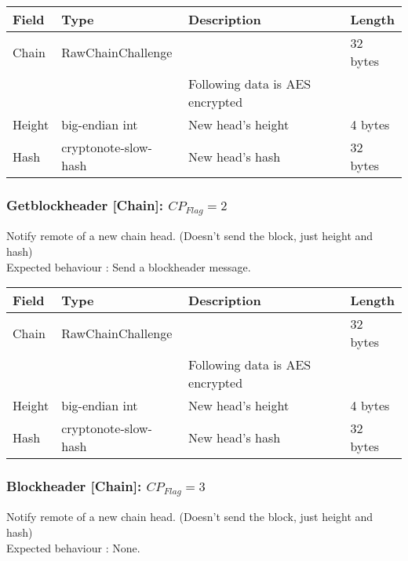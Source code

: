 \documentclass[a4paper,10pt]{article}
\begin{document}
                \noindent\begin{tabularx}{\textwidth}{|l|l|X|l|}
                    \hline Field & Type & Description & Length \\ \hline
                    \hline Chain & RawChainChallenge & & 32 bytes \\
                    \hline  & & Following data is AES encrypted & \\
                    \hline Height & big-endian int & New head's height & 4 bytes \\
                    \hline Hash & cryptonote-slow-hash & New head's hash & 32 bytes\\
                    \hline
                \end{tabularx}

            \subsubsection{Getblockheader [Chain]: $CP_{Flag} = 2$}
                Notify remote of a new chain head. (Doesn't send the block, just height and hash)\\
                Expected behaviour : Send a blockheader message.\\
                
                \noindent\begin{tabularx}{\textwidth}{|l|l|X|l|}
                    \hline Field & Type & Description & Length \\ \hline
                    \hline Chain & RawChainChallenge & & 32 bytes \\
                    \hline  & & Following data is AES encrypted & \\
                    \hline Height & big-endian int & New head's height & 4 bytes \\
                    \hline Hash & cryptonote-slow-hash & New head's hash & 32 bytes\\
                    \hline
                \end{tabularx}
            
            \subsubsection{Blockheader [Chain]: $CP_{Flag} = 3$}
                Notify remote of a new chain head. (Doesn't send the block, just height and hash)\\
                Expected behaviour : None.\\
                
\end{document}
